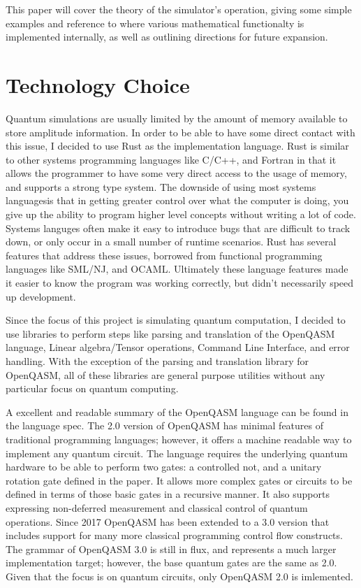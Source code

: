 \documentclass[%
 reprint,
 amsmath,amssymb,
 aps,
]{revtex4-2}
\begin{document}
This paper will cover the theory of the simulator's operation, giving some simple examples and reference to where various mathematical functionalty is implemented internally, as well as outlining directions for future expansion. 

\section{\label{sec:level1} Technology Choice}
Quantum simulations are usually limited by the amount of memory available to store amplitude information. In order to be able to have some direct contact with this issue, I decided to use Rust as the implementation language. Rust is similar to other systems programming languages like C/C++, and Fortran in that it allows the programmer to have some very direct access to the usage of memory, and supports a strong type system. The downside of using most systems languagesis that in getting greater control over what the computer is doing, you give up the ability to program higher level concepts without writing a lot of code. Systems languges often make it easy to introduce bugs that are difficult to track down, or only occur in a small number of runtime scenarios. Rust has several features that address these issues, borrowed from functional programming languages like SML/NJ, and OCAML. Ultimately these language features made it easier to know the program was working correctly, but didn't necessarily speed up development.

Since the focus of this project is simulating quantum computation, I decided to use libraries to perform steps like parsing and translation of the OpenQASM language, Linear algebra/Tensor operations, Command Line Interface, and error handling. With the exception of the parsing and translation library for OpenQASM, all of these libraries are general purpose utilities without any particular focus on quantum computing.

A excellent and readable summary of the OpenQASM language can be found in the language spec\cite{crossOpen2017}. The 2.0 version of OpenQASM has minimal features of traditional programming languages; however, it offers a machine readable way to implement any quantum circuit. The language requires the underlying quantum hardware to be able to perform two gates: a controlled not, and a unitary rotation gate defined in the paper. It allows more complex gates or circuits to be defined in terms of those basic gates in a recursive manner. It also supports expressing non-deferred measurement and classical control of quantum operations. Since 2017 OpenQASM has been extended to a 3.0 version that includes support for many more classical programming control flow constructs. The grammar of OpenQASM 3.0 is still in flux, and represents a much larger implementation target; however, the base quantum gates are the same as 2.0\cite{crossOpenQASM}. Given that the focus is on quantum circuits, only OpenQASM 2.0 is imlemented.
\end{document}

